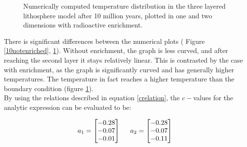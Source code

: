 \documentclass[10pt,a4paper]{article}
\begin{document}
\begin{figure} [H]
	\centering
	\caption{\label{10enriched}Numerically computed temperature distribution in the three layered lithosphere model after 10 million years, plotted in one and two dimensions with radioactive enrichment. }
\end{figure}

\noindent There is significant differences between the numerical plots ( Figure \ref{10notenriched}, \ref{10enriched}). Without enrichment, the graph is less curved, and after reaching the second layer it stays relatively linear. This is contrasted by the case with enrichment, as the graph is significantly curved and has generally higher temperatures. The temperature in fact reaches a higher temperature than the boundary condition (figure \ref{10enriched}).\\


\noindent By using the relations described in equation \ref{crelation}, the $c-$values for the analytic expression can be evaluated to be:

\begin{equation}
a_1=\begin{bmatrix}
-0.28\\
-0.07\\
-0.01\\
\end{bmatrix}\\
\hspace{0.5cm}
a_2=\begin{bmatrix}
-0.28\\
-0.07\\
-0.11\\
\end{bmatrix}\\
\vspace{0.5cm}
\end{equation}
\end{document}
